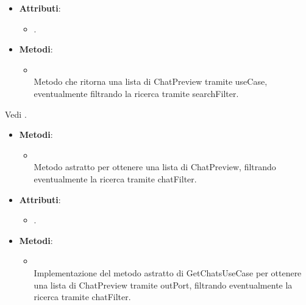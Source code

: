 \documentclass[10pt, a4paper]{article}
\begin{document}
\label{GetChatsControllerDettaglio}
\begin{itemize}
    \item \textbf{Attributi}:
    \begin{itemize}
        \item {}.
    \end{itemize}
    \item \textbf{Metodi}:
    \begin{itemize}
        \item {}\\
        Metodo che ritorna una lista di ChatPreview tramite useCase, eventualmente filtrando la ricerca tramite searchFilter. 
    \end{itemize}
\end{itemize}

Vedi .

\label{GetChatsUseCaseDettaglio}
\begin{itemize}
    \item \textbf{Metodi}:
    \begin{itemize}
        \item {}\\
        Metodo astratto per ottenere una lista di ChatPreview, filtrando eventualmente la ricerca tramite chatFilter.
    \end{itemize}
\end{itemize}

\label{GetChatsServiceDettaglio}
\begin{itemize}
    \item \textbf{Attributi}:
    \begin{itemize}
        \item {}.
    \end{itemize}
    \item \textbf{Metodi}:
    \begin{itemize}
        \item {}\\
        Implementazione del metodo astratto di GetChatsUseCase per ottenere una lista di ChatPreview tramite outPort, filtrando eventualmente la ricerca tramite chatFilter.
    \end{itemize}
\end{itemize}
\end{document}
